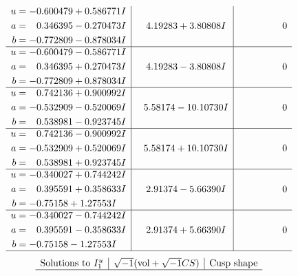 \documentclass[1p]{elsarticle_modified}
\theoremstyle{definition}
\newcommand{\I}{\sqrt{-1}}
\begin{document}
$$\begin{array}{c|c|c}
\begin{aligned}
u &= -0.600479 + 0.586771 I \\
a &= \phantom{-}0.346395 - 0.270473 I \\
b &= -0.772809 - 0.878034 I\end{aligned}
 & \phantom{-}4.19283 + 3.80808 I & \phantom{-0.000000 } 0 \\ \hline\begin{aligned}
u &= -0.600479 - 0.586771 I \\
a &= \phantom{-}0.346395 + 0.270473 I \\
b &= -0.772809 + 0.878034 I\end{aligned}
 & \phantom{-}4.19283 - 3.80808 I & \phantom{-0.000000 } 0 \\ \hline\begin{aligned}
u &= \phantom{-}0.742136 + 0.900992 I \\
a &= -0.532909 - 0.520069 I \\
b &= \phantom{-}0.538981 - 0.923745 I\end{aligned}
 & \phantom{-}5.58174 - 10.10730 I & \phantom{-0.000000 } 0 \\ \hline\begin{aligned}
u &= \phantom{-}0.742136 - 0.900992 I \\
a &= -0.532909 + 0.520069 I \\
b &= \phantom{-}0.538981 + 0.923745 I\end{aligned}
 & \phantom{-}5.58174 + 10.10730 I & \phantom{-0.000000 } 0 \\ \hline\begin{aligned}
u &= -0.340027 + 0.744242 I \\
a &= \phantom{-}0.395591 + 0.358633 I \\
b &= -0.75158 + 1.27553 I\end{aligned}
 & \phantom{-}2.91374 - 5.66390 I & \phantom{-0.000000 } 0 \\ \hline\begin{aligned}
u &= -0.340027 - 0.744242 I \\
a &= \phantom{-}0.395591 - 0.358633 I \\
b &= -0.75158 - 1.27553 I\end{aligned}
 & \phantom{-}2.91374 + 5.66390 I & \phantom{-0.000000 } 0\\
 \hline 
 \end{array}$$\newpage$$\begin{array}{c|c|c}  
\text{Solutions to }I^u_{1}& \I (\text{vol} + \sqrt{-1}CS) & \text{Cusp shape}\\
 \hline 

\end{array}$$
\end{document}
